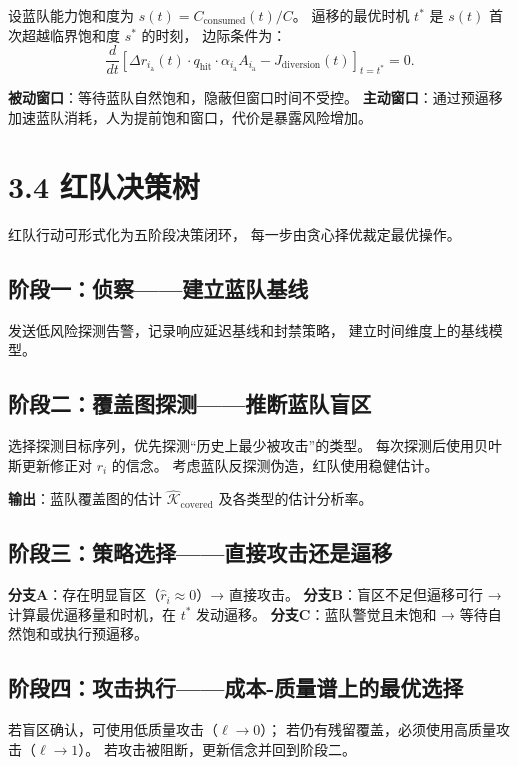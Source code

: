 \documentclass[11pt,a4paper]{article}
\begin{document}
设蓝队能力饱和度为 $s(t) = C_{\text{consumed}}(t)/C$。
逼移的最优时机 $t^*$ 是 $s(t)$ 首次超越临界饱和度 $s^*$ 的时刻，
边际条件为：
\[
\frac{d}{dt} \left[ \Delta r_{i_{\text{a}}}(t) \cdot q_{\text{hit}} \cdot \alpha_{i_{\text{a}}} A_{i_{\text{a}}} - J_{\text{diversion}}(t) \right]_{t=t^*} = 0.
\]

\textbf{被动窗口}：等待蓝队自然饱和，隐蔽但窗口时间不受控。
\textbf{主动窗口}：通过预逼移加速蓝队消耗，人为提前饱和窗口，代价是暴露风险增加。

\section{3.4 红队决策树}

红队行动可形式化为五阶段决策闭环，
每一步由贪心择优裁定最优操作。

\subsection{阶段一：侦察——建立蓝队基线}

发送低风险探测告警，记录响应延迟基线和封禁策略，
建立时间维度上的基线模型。

\subsection{阶段二：覆盖图探测——推断蓝队盲区}

选择探测目标序列，优先探测“历史上最少被攻击”的类型。
每次探测后使用贝叶斯更新修正对 $r_i$ 的信念。
考虑蓝队反探测伪造，红队使用稳健估计。

\textbf{输出}：蓝队覆盖图的估计 $\hat{\mathcal{K}}_{\text{covered}}$ 及各类型的估计分析率。

\subsection{阶段三：策略选择——直接攻击还是逼移}

\textbf{分支A}：存在明显盲区（$\hat{r}_i \approx 0$）→ 直接攻击。
\textbf{分支B}：盲区不足但逼移可行 → 计算最优逼移量和时机，在 $t^*$ 发动逼移。
\textbf{分支C}：蓝队警觉且未饱和 → 等待自然饱和或执行预逼移。

\subsection{阶段四：攻击执行——成本-质量谱上的最优选择}

若盲区确认，可使用低质量攻击（$\ell \to 0$）；
若仍有残留覆盖，必须使用高质量攻击（$\ell \to 1$）。
若攻击被阻断，更新信念并回到阶段二。
\end{document}
